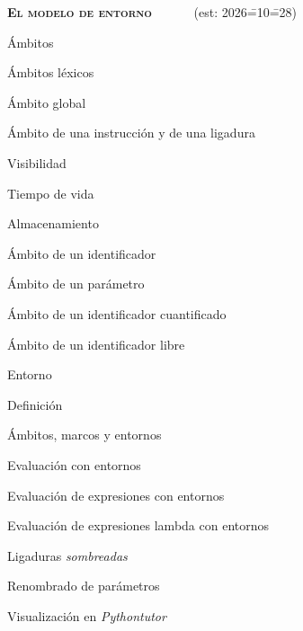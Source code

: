 \begin{longenum}
\begin{longenum}
    \end{longenum}
    \item \textbf{\textsc{El modelo de entorno}} \ \ \ \ \ \ (est: 2026\==10\==28)
    \begin{longenum}
        \item Ámbitos
        \begin{longenum}
            \item Ámbitos léxicos
            \begin{longenum}
                \item Ámbito global
            \end{longenum}
            \item Ámbito de una instrucción y de una ligadura
            \begin{longenum}
                \item Visibilidad
                \item Tiempo de vida
                \item Almacenamiento
            \end{longenum}
            \item Ámbito de un identificador
            \item Ámbito de un parámetro
            \item Ámbito de un identificador cuantificado
            \item Ámbito de un identificador libre
        \end{longenum}
        \item Entorno
        \begin{longenum}
            \item Definición
            \item Ámbitos, marcos y entornos
        \end{longenum}
        \item Evaluación con entornos
        \begin{longenum}
            \item Evaluación de expresiones con entornos
            \item Evaluación de expresiones lambda con entornos
            \begin{longenum}
                \item Ligaduras \textit{sombreadas}
                \item Renombrado de parámetros
                \item Visualización en \textit{Pythontutor}

\end{longenum}
\end{longenum}
\end{longenum}
\end{longenum}
